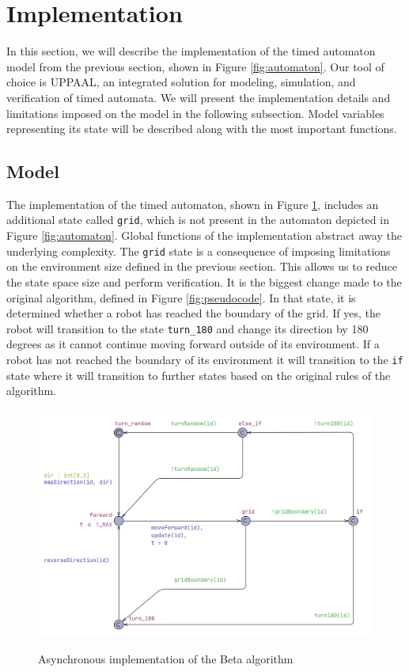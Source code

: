\section{Implementation}
In this section, we will describe the implementation of the timed automaton model from the previous section, shown in Figure \ref{fig:automaton}. Our tool of choice is UPPAAL, an integrated solution for modeling, simulation, and verification of timed automata. We will present the implementation details and limitations imposed on the model in the following subsection.  Model variables representing its state will be described along with the most important functions.


\subsection{Model}
The implementation of the timed automaton, shown in Figure \ref{fig:implementation}, includes an additional state called \texttt{grid}, which is not present in the automaton depicted in Figure \ref{fig:automaton}. Global functions of the implementation abstract away the underlying complexity. The  \texttt{grid} state is a consequence of imposing limitations on the environment size defined in the previous section. This allows us to reduce the state space size and perform verification. It is the biggest change made to the original algorithm, defined in Figure \ref{fig:pseudocode}. In that state, it is determined whether a robot has reached the boundary of the grid. If yes, the robot will transition to the state \texttt{turn\_180} and change its direction by 180 degrees as it cannot continue moving forward outside of its environment. If a robot has not reached the boundary of its environment it will transition to the \texttt{if} state where it will transition to further states based on the original rules of the algorithm.

\begin{figure}[H]
\caption{Asynchronous implementation of the Beta algorithm}
\includegraphics[width=\textwidth]{images/implementation_asynchronous.png}
\label{fig:implementation}
\end{figure}

